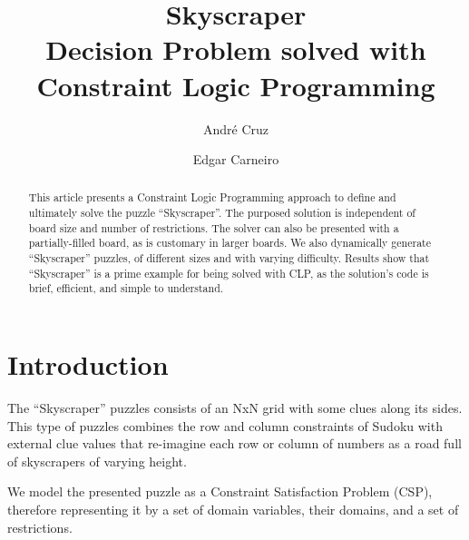 \documentclass{llncs}
\begin{document}
\title{Skyscraper\\Decision Problem solved with Constraint Logic Programming}
%
%
\author{André Cruz \and Edgar Carneiro}
%
%
%

\maketitle              %

\begin{abstract}
This article presents a Constraint Logic Programming approach to define and ultimately solve the puzzle ``Skyscraper''.
The purposed solution is independent of board size and number of restrictions.
The solver can also be presented with a partially-filled board, as is customary in larger boards.
We also dynamically generate ``Skyscraper'' puzzles, of different sizes and with varying difficulty.
Results show that ``Skyscraper'' is a prime example for being solved with CLP, as the solution's code is brief, efficient, and simple to understand.

\end{abstract}
%
\section{Introduction}
%
The ``Skyscraper'' puzzles consists of an NxN grid with some clues along its sides. This type of puzzles combines the row and column constraints of Sudoku with external clue values that re-imagine each row or column of numbers as a road full of skyscrapers of varying height.

We model the presented puzzle as a Constraint Satisfaction Problem (CSP), therefore representing it by a set of domain variables, their domains, and a set of restrictions.
\end{document}
